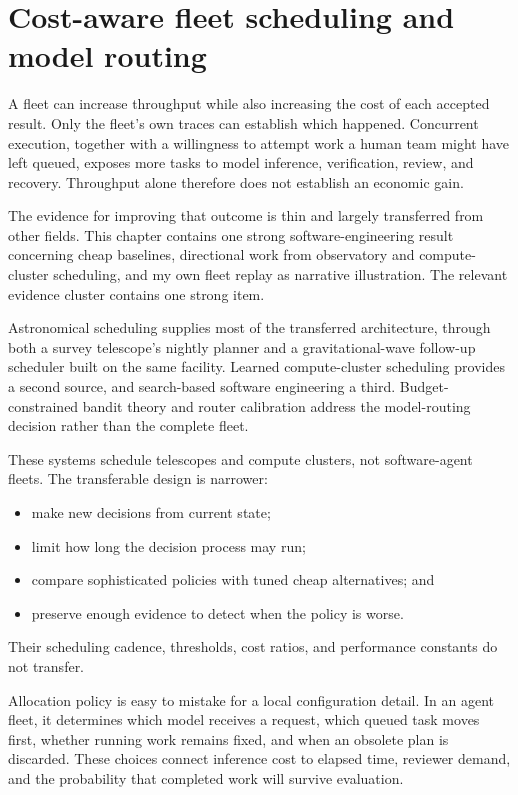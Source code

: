 \chapter{Cost-aware fleet scheduling and model routing}
\label{ch18-cost-aware-fleet-scheduling-model-routing}
A fleet can increase throughput while also increasing the cost of each accepted result. Only the fleet's own traces can establish which happened. Concurrent execution, together with a willingness to attempt work a human team might have left queued, exposes more tasks to model inference, verification, review, and recovery. Throughput alone therefore does not establish an economic gain.

The evidence for improving that outcome is thin and largely transferred from other fields. This chapter contains one strong software-engineering result concerning cheap baselines, directional work from observatory and compute-cluster scheduling, and my own fleet replay as narrative illustration. The relevant evidence cluster contains one strong item.

Astronomical scheduling supplies most of the transferred architecture, through both a survey telescope's nightly planner and a gravitational-wave follow-up scheduler built on the same facility. Learned compute-cluster scheduling provides a second source, and search-based software engineering a third. Budget-constrained bandit theory and router calibration address the model-routing decision rather than the complete fleet.

These systems schedule telescopes and compute clusters, not software-agent fleets. The transferable design is narrower:

\begin{itemize}
\tightlist
\item
  make new decisions from current state;
\item
  limit how long the decision process may run;
\item
  compare sophisticated policies with tuned cheap alternatives; and
\item
  preserve enough evidence to detect when the policy is worse.
\end{itemize}

Their scheduling cadence, thresholds, cost ratios, and performance constants do not transfer.

Allocation policy is easy to mistake for a local configuration detail. In an agent fleet, it determines which model receives a request, which queued task moves first, whether running work remains fixed, and when an obsolete plan is discarded. These choices connect inference cost to elapsed time, reviewer demand, and the probability that completed work will survive evaluation.

